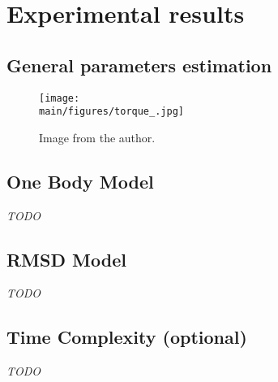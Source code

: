 \documentclass[/home/francois/latex/report/main.tex]{subfiles}
\begin{document}
\chapter{Experimental results}
\label{chapter:results}

\section{General parameters estimation}
\label{section:results-general-parameters}


\begin{figure}[H]
  \centering
  \texttt{[image: \\main/figures/torque\_.jpg]}
  \caption{ Image from the author.}
  \label{fig:results:torque_}
\end{figure}

\section{One Body Model}

\textit{TODO}

\section{RMSD Model}

\textit{TODO}

\section{Time Complexity (optional)}

\textit{TODO}
\end{document}
